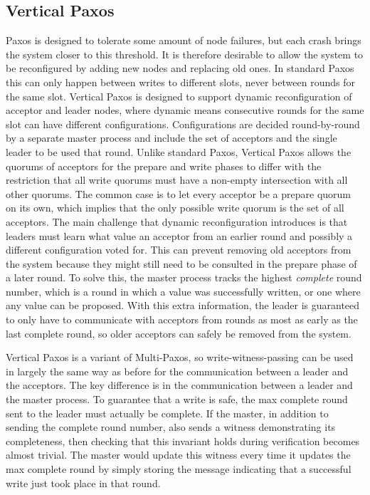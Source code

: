 \subsection{Vertical Paxos}
\label{subsec:vertical-paxos}
Paxos is designed to tolerate some amount of node failures, but each crash brings the system closer
to this threshold.
It is therefore desirable to allow the system to be reconfigured by adding new nodes and replacing
old ones.
In standard Paxos this can only happen between writes to different slots, never between rounds for
the same slot.
Vertical Paxos \cite{vertpaxos} is designed to support dynamic reconfiguration of acceptor and leader nodes,
where dynamic means consecutive rounds for the same slot can have different configurations.
Configurations are decided round-by-round by a separate master process and include the set of
acceptors and the single leader to be used that round.
Unlike standard Paxos, Vertical Paxos allows the quorums of acceptors for the prepare and write
phases to differ with the restriction that all write quorums must have a non-empty intersection
with all other quorums.
The common case is to let every acceptor be a prepare quorum on its own, which implies that the only
possible write quorum is the set of all acceptors.
The main challenge that dynamic reconfiguration introduces is that leaders must learn what value an
acceptor from an earlier round and possibly a different configuration voted for.
This can prevent removing old acceptors from the system because they might still need to be consulted in the
prepare phase of a later round.
To solve this, the master process tracks the highest \emph{complete} round number, which is a round
in which a value was successfully written, or one where any value can be proposed.
With this extra information, the leader is guaranteed to only have to communicate with acceptors from
rounds as most as early as the last complete round, so older acceptors can safely be removed from the system.

Vertical Paxos is a variant of Multi-Paxos, so write-witness-passing can be used in largely the same way
as before for the communication between a leader and the acceptors.
The key difference is in the communication between a leader and the master process.
To guarantee that a write is safe, the max complete round sent to the leader must actually be complete.
If the master, in addition to sending the complete round number, also sends a witness demonstrating its
completeness, then checking that this invariant holds during verification becomes almost trivial.
The master would update this witness every time it updates the max complete round by simply storing the
message indicating that a successful write just took place in that round.

